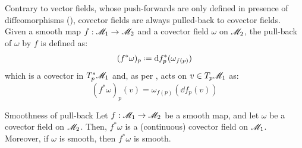 Contrary to vector fields, whose push-forwards are only defined in presence of diffeomorphisms (), covector fields are always pulled-back to covector fields. Given a smooth map $ f : \mathscr{M}_1 \rightarrow \mathscr{M}_2 $ and a covector field $ \omega $ on $ \mathscr{M}_2 $, the pull-back of $ \omega $ by $ f $ is defined as:
\begin{equation}
  (f^*\omega)_p \defeq \dd f^*_p(\omega_{f(p)})
\end{equation}
which is a covector in $ T_p^*\mathscr{M}_1 $ and, as per , acts on $ v \in T_p\mathscr{M}_1 $ as:
\begin{equation*}
  (f^*\omega)_p(v) = \omega_{f(p)}(\dd f_p(v))
\end{equation*}

\begin{proposition}{Smoothness of pull-back}{}
  Let $ f : \mathscr{M}_1 \rightarrow \mathscr{M}_2 $ be a smooth map, and let $ \omega $ be a covector field on $ \mathscr{M}_2 $. Then, $ f^*\omega $ is a (continuous) covector field on $ \mathscr{M}_1 $. Moreover, if $ \omega $ is smooth, then $ f^*\omega $ is smooth.
\end{proposition}

